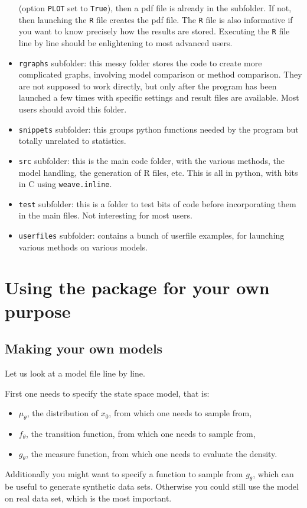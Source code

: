 \documentclass[a4paper,10pt]{paper}
\begin{document}
\begin{itemize}
(option \texttt{PLOT} set to \texttt{True}), then a pdf file is already in the subfolder. If not, then launching the \texttt{R} file creates the pdf file.
The \texttt{R} file is also informative if you want to know precisely how the results are stored. Executing the \texttt{R} file line by line should be enlightening to most advanced users.
 \item \texttt{rgraphs} subfolder: this messy folder stores the code to create more complicated graphs, involving model comparison or method comparison. They are not supposed to work directly, but only after the program has been launched a few times with specific settings and result files are available. Most users should avoid this folder.
 \item \texttt{snippets} subfolder: this groups python functions needed by the program but totally unrelated to statistics.
 \item \texttt{src} subfolder: this is the main code folder, with the various methods, the model handling, the generation of R files, etc. This is 
all in python, with bits in C using \texttt{weave.inline}.
 \item \texttt{test} subfolder: this is a folder to test bits of code before incorporating them in the main files. Not interesting for most users.
 \item \texttt{userfiles} subfolder: contains a bunch of userfile examples, for launching various methods on
various models.
\end{itemize}


\section{Using the package for your own purpose}

\subsection{Making your own models}

Let us look at a model file line by line.

First one needs to specify the state space model, that is:
\begin{itemize}
 \item $\mu_\theta$, the distribution of $x_0$, from which one needs to sample from,
 \item $f_\theta$, the transition function, from which one needs to sample from,
 \item $g_\theta$, the measure function, from which one needs to evaluate the density.
\end{itemize}
Additionally you might want to specify a function to sample from $g_\theta$, which 
can be useful to generate synthetic data sets. Otherwise you could still use the model
on real data set, which is the most important.
\end{document}
